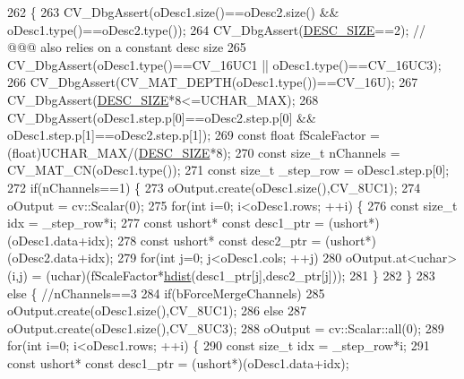 \begin{DoxyCode}
262                                                                                                            
        \{
263     CV\_DbgAssert(oDesc1.size()==oDesc2.size() && oDesc1.type()==oDesc2.type());
264     CV\_DbgAssert(\mbox{\hyperlink{class_l_b_s_p_a11167130ddc713921e5bbb0b628d5f74}{DESC\_SIZE}}==2); \textcolor{comment}{// @@@ also relies on a constant desc size}
265     CV\_DbgAssert(oDesc1.type()==CV\_16UC1 || oDesc1.type()==CV\_16UC3);
266     CV\_DbgAssert(CV\_MAT\_DEPTH(oDesc1.type())==CV\_16U);
267     CV\_DbgAssert(\mbox{\hyperlink{class_l_b_s_p_a11167130ddc713921e5bbb0b628d5f74}{DESC\_SIZE}}*8<=UCHAR\_MAX);
268     CV\_DbgAssert(oDesc1.step.p[0]==oDesc2.step.p[0] && oDesc1.step.p[1]==oDesc2.step.p[1]);
269     \textcolor{keyword}{const} \textcolor{keywordtype}{float} fScaleFactor = (float)UCHAR\_MAX/(\mbox{\hyperlink{class_l_b_s_p_a11167130ddc713921e5bbb0b628d5f74}{DESC\_SIZE}}*8);
270     \textcolor{keyword}{const} \textcolor{keywordtype}{size\_t} nChannels = CV\_MAT\_CN(oDesc1.type());
271     \textcolor{keyword}{const} \textcolor{keywordtype}{size\_t} \_step\_row = oDesc1.step.p[0];
272     \textcolor{keywordflow}{if}(nChannels==1) \{
273         oOutput.create(oDesc1.size(),CV\_8UC1);
274         oOutput = cv::Scalar(0);
275         \textcolor{keywordflow}{for}(\textcolor{keywordtype}{int} i=0; i<oDesc1.rows; ++i) \{
276             \textcolor{keyword}{const} \textcolor{keywordtype}{size\_t} idx = \_step\_row*i;
277             \textcolor{keyword}{const} ushort* \textcolor{keyword}{const} desc1\_ptr = (ushort*)(oDesc1.data+idx);
278             \textcolor{keyword}{const} ushort* \textcolor{keyword}{const} desc2\_ptr = (ushort*)(oDesc2.data+idx);
279             \textcolor{keywordflow}{for}(\textcolor{keywordtype}{int} j=0; j<oDesc1.cols; ++j)
280                 oOutput.at<uchar>(i,j) = (uchar)(fScaleFactor*\mbox{\hyperlink{_distance_utils_8h_ab13812ef6e21af771d6c0a856cd941b0}{hdist}}(desc1\_ptr[j],desc2\_ptr[j]));
281         \}
282     \}
283     \textcolor{keywordflow}{else} \{ \textcolor{comment}{//nChannels==3}
284         \textcolor{keywordflow}{if}(bForceMergeChannels)
285             oOutput.create(oDesc1.size(),CV\_8UC1);
286         \textcolor{keywordflow}{else}
287             oOutput.create(oDesc1.size(),CV\_8UC3);
288         oOutput = cv::Scalar::all(0);
289         \textcolor{keywordflow}{for}(\textcolor{keywordtype}{int} i=0; i<oDesc1.rows; ++i) \{
290             \textcolor{keyword}{const} \textcolor{keywordtype}{size\_t} idx =  \_step\_row*i;
291             \textcolor{keyword}{const} ushort* \textcolor{keyword}{const} desc1\_ptr = (ushort*)(oDesc1.data+idx);

\end{DoxyCode}
